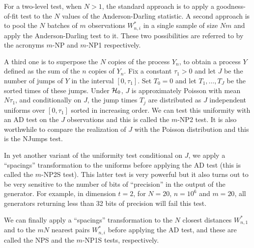 For a two-level test, when $N>1$, the standard approach is to
apply a goodness-of-fit test to the $N$ values of the
Anderson-Darling statistic. A second approach is to pool the $N$ batches
of $m$ observations $W^*_{n,i}$ in a single sample of size $Nm$ and apply
the Anderson-Darling test to it.
These two possibilities are referred to by the acronyms
{$m$-NP} and {$m$-NP1} respectively.

A third one is to superpose the $N$ copies of the process $Y_n$,
to obtain a process $Y$ defined as the sum of the $n$ copies of $Y_n$.
Fix a constant $\tau_1> 0$ and let $J$ be the number of jumps of $Y$ in the
interval $[0,\tau_1]$. Set $T_0 = 0$
and let $T_1,\dots,T_{J}$ be the sorted times of these jumps.
Under $\mathcal{H}_0$, $J$ is approximately Poisson with mean $N \tau_1$,
and conditionally on $J$, the jump times $T_j$ are distributed
as $J$ independent uniforms over $[0,\tau_1]$ sorted in increasing order.
We can test this uniformity with an AD test on the $J$ observations and
this  is called the {$m$-NP2} test.
It is also worthwhile to compare the realization of $J$ with the Poisson
distribution and this is the {NJumps} test.

In yet another variant of the uniformity test conditional on $J$,
we apply a ``spacings'' transformation to the uniforms before applying the
AD test (this is called the  {$m$-NP2S} test).
This latter test is very powerful but it also turns out to be very sensitive
to the number of bits of ``precision'' in the output of the generator.
For example, in dimension $t=2$, for $N=20$, $n=10^6$ and $m=20$,
all generators returning less than 32 bits of precision will fail this test.

We can finally apply a ``spacings'' transformation to the $N$ closest distances
$W^*_{n,1}$ and to the $mN$ nearest pairs $W^*_{n,i}$ before applying the
AD test, and these are called the {NPS} and the {$m$-NP1S} tests, respectively.

\iffalse
 A third approach is to pool all the
jump times of the $N$ copies $Y_n$ that occur in the interval $[0,m]$,
say $T_1,\dots,T_{n'}$, define $W^*_{i} = 1 -\exp[-N(T_i - T_{i-1})]$
for $1\le i\le n'$, where $T_0=0$, and compare the distribution
of these $W^*_i$ to the uniform one by an Anderson-Darling test.
Here, $n'$ is a Poisson
 random variable with mean $Nm$.
Conditionally on $n'$, the jump times should be distributed as
independent uniforms over $[0,m]$.
\hpierre {Must clarify details here....  This is not in the paper.
   This way, with $n'$ random, the $W^*_i$ are no longer i.i.d. uniform.}
These three possibilities are referred to by the acronyms
$m$-NP, $m$-NP1, and $m$-NP2, respectively.
\fi

